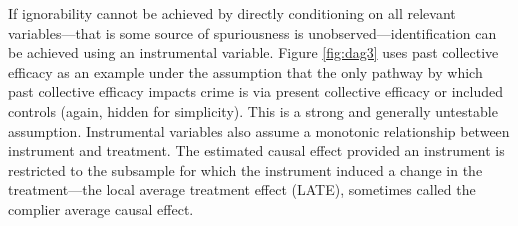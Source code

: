 \documentclass [11pt, proquest] {uwthesis}[2015/03/03]
\begin{document}
If ignorability cannot be achieved by directly conditioning on all relevant variables---that is some source of spuriousness is unobserved---identification can be achieved using an instrumental variable. Figure \ref{fig:dag3} uses past collective efficacy as an example under the assumption that the only pathway by which past collective efficacy impacts crime is via present collective efficacy or included controls (again, hidden for simplicity). This is a strong and generally untestable assumption. Instrumental variables also assume a monotonic relationship between instrument and treatment. The estimated causal effect provided an instrument is restricted to the subsample for which the instrument induced a change in the treatment---the local average treatment effect (LATE), sometimes called the complier average causal effect.
\end{document}

